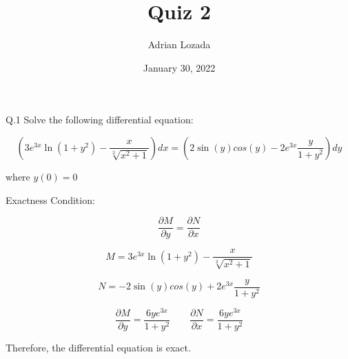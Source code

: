 \documentclass{article}
\author{Adrian Lozada}
\title{Quiz 2}
\date{January 30, 2022}
\begin{document}
    \maketitle
    
    \newpage
    \begin{flushleft}
        Q.1 Solve the following differential equation:
    \end{flushleft}

    \begin{center}
        \begin{equation}
            \left( 3e^{3x}\ln{(1+y^{2})}-\frac{x}{\sqrt[2]{x^{2}+1}} \right)dx 
            =
            \left(2\sin{(y)}cos{(y)}-2e^{3x}\frac{y}{1+y^{2}}\right)dy
        \end{equation}
    \end{center}

    \begin{flushleft}
        where $y(0)=0$
    \end{flushleft}

    \begin{flushleft}
        Exactness Condition:
    \end{flushleft}
    \begin{equation}
        \frac{\partial M}{\partial y} = \frac{\partial N}{\partial x}
    \end{equation}
    
    \begin{equation}
        M = 3e^{3x}\ln{(1+y^{2})}-\frac{x}{\sqrt[2]{x^{2}+1}}
    \end{equation}

    \begin{equation}
        N = -2\sin{(y)}cos{(y)}+2e^{3x}\frac{y}{1+y^{2}}
    \end{equation}

    \begin{equation}
        \frac{\partial M}{\partial y} = \frac{6ye^{3x}}{1+y^{2}}
        \qquad
        \frac{\partial N}{\partial x} = \frac{6ye^{3x}}{1+y^{2}}
    \end{equation}
    
    \begin{flushleft}
        Therefore, the differential equation is exact.
    \end{flushleft}
\end{document}
